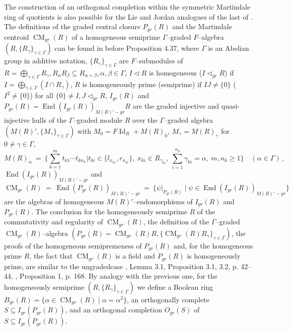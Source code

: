 \documentclass[a4paper,11pt]{article}
\DeclareMathOperator{\Id}{Id}
\DeclareMathOperator{\End}{End}
\DeclareMathOperator{\CM}{CM}
\begin{document}
The construction of an orthogonal completion within the symmetric Martindale 
ring of quotients is also possible for the Lie and Jordan analogues of the 
last of \cite{Mol, JMQ}.
The definitions of the graded central closure $P_{gr}(R)$ and the Martindale 
centroid $\CM_{gr}(R)$ of a homogeneous semiprime $\Gamma$--graded 
$F$--algebra ${(R, \{R_{\gamma}\}_{\gamma\in \Gamma})}$ can be found in 
\cite{Gol6} before Proposition 4.37, where $\Gamma$ is an Abelian group in 
additive notation, $\{R_{\gamma}\}_{\gamma\in \Gamma}$ are $F$--submodules of 
${R=\bigoplus\limits_{\gamma\in \Gamma} R_{\gamma}, 
R_{\alpha} R_{\beta}\subseteq R_{\alpha+\beta}, 
\alpha, \beta\in \Gamma}$, ${I\lhd R}$ is homogeneous (${I\lhd_{gr} R}$) if 
${I=\bigoplus\limits_{\gamma\in \Gamma} (I\cap R_{\gamma})}$, 
$R$ is homogeneously prime (semiprime) if ${I J\ne \{0\}}$ 
(${I^2\ne \{0\}}$) for all ${\{0\}\ne I, J\lhd_{gr} R}$, 
$I_{gr}(R)$ and ${P_{gr}(R)=\End(I_{gr}(R))_{M(R)'-gr} R}$ are the graded 
injective and quasi-injective hulls of the $\Gamma$--graded module $R$ over the 
$\Gamma$--graded algebra ${(M(R)', \{M_{\gamma}\}_{\gamma\in \Gamma})}$ with 
${M_0=F \Id_R+M(R)_0}$, ${M_{\gamma}=M(R)_{\gamma}}$ for 
${0\ne \gamma\in \Gamma}$,  
\[
M(R)_{\alpha}\ =\ \Biggl\{\sum_{k=1}^m t_{k 1}\cdots t_{kn_k}\Biggl| 
t_{ki}\in \{l_{x_{ki}}, r_{x_{ki}}\},\ x_{ki}\in R_{\gamma_{ki}},\ 
\sum_{i=1}^{n_k} \gamma_{ki}=\alpha,\ m, n_k\geq 1\Biggr\}\quad 
(\alpha\in \Gamma)\,,
\]
$\End(I_{gr}(R))_{M(R)'-gr}$ and  
\[
\CM_{gr}(R)\ =\ \End(P_{gr}(R))_{M(R)'-gr}\ =\ 
\{\psi|_{P_{gr}(R)}\mid \psi\in \End(I_{gr}(R))_{M(R)'-gr}\}
\]
are the algebras of homogeneous $M(R)'$--endomorphisms of $I_{gr}(R)$ and 
$P_{gr}(R)$. The conclu\-sion for the homogeneously semiprime $R$ of the 
commutativity and regularity of 
$\CM_{gr}(R)$, the definition of the $\Gamma$--graded $\CM_{gr}(R)$--algebra 
${(P_{gr}(R)=\CM_{gr}(R) R, \{\CM_{gr}(R) R_{\gamma}\}_{\gamma\in \Gamma})}$,  
the proofs of the homogeneous semipremeness of $P_{gr}(R)$ and, for the 
homogeneous prime $R$, the fact that $\CM_{gr}(R)$ is a field and $P_{gr}(R)$ 
is homogeneously prime, are similar to the ungraded\linebreak case 
\cite{Raz}, Lemma 3.1, Proposition 3.1, 3.2, p. 42--44, \cite{Lamb}, 
Proposition 1, p. 168. 
By analogy with the previous one, for the homogeneously semiprime 
${(R, \{R_{\gamma}\}_{\gamma\in \Gamma})}$ we define a Boolean ring 
${B_{gr}(R)=\{\alpha\in \CM_{gr}(R)\mid \alpha=\alpha^2\}}$, an 
orthogonally complete ${S\subseteq I_{gr}(P_{gr}(R))}$, and an 
orthogonal completion $O_{gr}(S)$ of ${S\subseteq I_{gr}(P_{gr}(R))}$.
\end{document}
